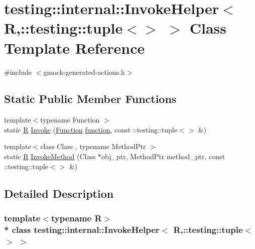 \hypertarget{classtesting_1_1internal_1_1_invoke_helper_3_01_r_00_1_1testing_1_1tuple_3_4_01_4}{}\section{testing\+:\+:internal\+:\+:Invoke\+Helper$<$ R,\+:\+:testing\+:\+:tuple$<$$>$ $>$ Class Template Reference}
\label{classtesting_1_1internal_1_1_invoke_helper_3_01_r_00_1_1testing_1_1tuple_3_4_01_4}


{\ttfamily \#include $<$gmock-\/generated-\/actions.\+h$>$}

\subsection*{Static Public Member Functions}
\begin{DoxyCompactItemize}
\item 
{\footnotesize template$<$typename Function $>$ }\\static \hyperlink{typedefs__9_8js_afb423b73ee7b6c04d2d54fc06e405404}{R} \hyperlink{classtesting_1_1internal_1_1_invoke_helper_3_01_r_00_1_1testing_1_1tuple_3_4_01_4_aa695e527af9f3efc6c8098c2467e5e7c}{Invoke} (\hyperlink{structtesting_1_1internal_1_1_function}{Function} \hyperlink{_07copy_08_2_undistort_image_8m_aa0b19300b507d475ab9f1525750bc11f}{function}, const \+::testing\+::tuple$<$$>$ \&)
\item 
{\footnotesize template$<$class Class , typename Method\+Ptr $>$ }\\static \hyperlink{typedefs__9_8js_afb423b73ee7b6c04d2d54fc06e405404}{R} \hyperlink{classtesting_1_1internal_1_1_invoke_helper_3_01_r_00_1_1testing_1_1tuple_3_4_01_4_acd2b09ae48134b49f388be348b0d8c72}{Invoke\+Method} (Class $\ast$obj\+\_\+ptr, Method\+Ptr method\+\_\+ptr, const \+::testing\+::tuple$<$$>$ \&)
\end{DoxyCompactItemize}


\subsection{Detailed Description}
\subsubsection*{template$<$typename R$>$\\*
class testing\+::internal\+::\+Invoke\+Helper$<$ R,\+::testing\+::tuple$<$$>$ $>$}



